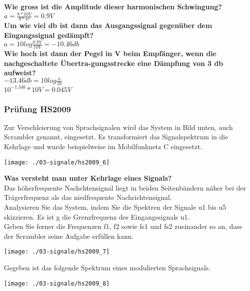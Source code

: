 \textbf{Wie gross ist die Amplitude dieser harmonischen Schwingung?}\\
$a=\frac{8*10V}{9*\pi^2}=0.9V$\\

\textbf{Um wie viel db ist dann das Ausgangssignal gegenüber dem Eingangssignal gedämpft?}\\
$a=10log\frac{0.9V}{10V}=-10.46db$\\

\textbf{Wie hoch ist dann der Pegel in V beim Empfänger, wenn die nachgeschaltete Übertra-gungsstrecke eine Dämpfung von 3 db aufweist?}\\
$-13.46db = 10log\frac{x}{10}$\\
$10^{-1.346}*10V = 0.045V$

\subsubsection{Prüfung HS2009}
Zur Verschleierung von Sprachsignalen wird das System in Bild unten, auch Scrambler genannt, eingesetzt. Es transformiert das Signalspektrum in die Kehrlage und wurde beispielweise im Mobilfunknetz C eingesetzt.\\
\begin{center}
    \vspace{-8pt}
    \texttt{[image: ./03-signale/hs2009\_6]}
    \vspace{-8pt}
\end{center}

\textbf{Was versteht man unter Kehrlage eines Signals?}\\
Das höherfrequente Nachchtensignal liegt in beiden Seitenbändern näher bei der Trägerfrequenz als das niedfrequente Nachrichtensignal.\\

Analysieren Sie das System, indem Sie die Spektren der Signale u1 bis u5 skizzieren. Es ist g die Grenzfrequenz des Eingangssignals u1.\\
Geben Sie ferner die Frequenzen f1, f2 sowie fs1 und fs2 zueinander so an, dass der Scrambler seine Aufgabe erfüllen kann.
\begin{center}
    \vspace{-8pt}
    \texttt{[image: ./03-signale/hs2009\_7]}
    \vspace{-8pt}
\end{center}

Gegeben ist das folgende Spektrum eines modulierten Sprachsignals.
\begin{center}
    \vspace{-8pt}
    \texttt{[image: ./03-signale/hs2009\_8]}
    \vspace{-8pt}
\end{center}

